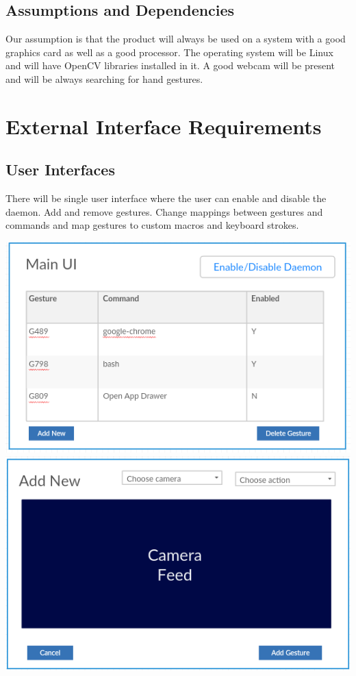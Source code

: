 \documentclass{scrreprt}
\begin{document}
\section{Assumptions and Dependencies}
Our assumption is that the product will always be used on a system with a good graphics card as well as a good processor. The operating system will be Linux and will have OpenCV libraries installed in it.
A good webcam will be present and will be always searching for hand gestures.

\chapter{External Interface Requirements}

\section{User Interfaces}
There will be single user interface where the user can enable and disable the daemon. Add and remove gestures. Change mappings between gestures and commands and map gestures to custom macros and keyboard strokes.
\\
\begin{center}
    \includegraphics[scale=0.8]{mainui.png}
    \\
    \includegraphics[scale=0.8]{addnewui.png}
\end{center}
\end{document}
